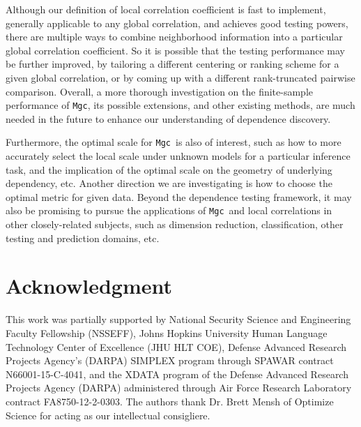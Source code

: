 \documentclass[11pt]{article}
\newcommand{\note}[2][]{\added[#1,remark={#2}]{}}
\providecommand{\sct}[1]{{\sc \texttt{#1}}}
\newcommand{\Mgc}{\sct{Mgc}}
\newcommand{\jv}[1]{{\note{jv: #1}}}
\newcommand{\cs}[1]{{\note{cs: #1}}}
\begin{document}
\cs{maybe we should mention some sparsity something, since we are sparsifying?}
\jv{not sure what you mean above, let us talk}
Although our definition of local correlation coefficient is fast to implement, generally applicable to any global correlation, and achieves good testing powers, there are multiple ways to combine neighborhood information into a particular global correlation coefficient. So it is possible that the testing performance may be further improved, by tailoring a different centering or ranking scheme for a given global correlation, or by coming up with a different rank-truncated pairwise comparison. Overall, a more thorough investigation on the finite-sample performance of \Mgc, its possible extensions, and other existing methods, are much needed in the future to enhance our understanding of dependence discovery.

Furthermore, the optimal scale for \Mgc~is also of interest, such as how to more accurately select the local scale under unknown models for a particular inference task, and the implication of the optimal scale on the geometry of underlying dependency, etc. Another direction we are investigating is how to choose the optimal metric for given data. Beyond the dependence testing framework, it may also be promising to pursue the applications of \Mgc~and local correlations in other closely-related subjects, such as dimension reduction, classification, other testing and prediction domains, etc.

\cs{scaling up via FlashX?}





\section*{Acknowledgment}
This work was partially supported by
%
National Security Science and Engineering Faculty Fellowship (NSSEFF),
%
Johns Hopkins University Human Language Technology Center of Excellence (JHU HLT COE),
%
Defense Advanced Research Projects Agency's (DARPA) SIMPLEX program through SPAWAR contract N66001-15-C-4041,
%
and the XDATA program of the Defense Advanced Research Projects Agency (DARPA) administered through Air Force Research Laboratory contract FA8750-12-2-0303. The authors thank Dr. Brett Mensh of Optimize Science for acting as our intellectual consigliere.



\appendix
\setcounter{figure}{0}
\renewcommand\thefigure{A\arabic{figure}}
\end{document}
